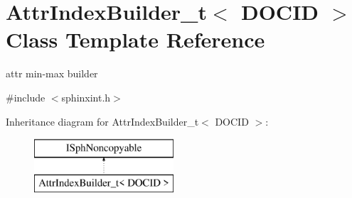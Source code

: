 \hypertarget{classAttrIndexBuilder__t}{\section{Attr\-Index\-Builder\-\_\-t$<$ D\-O\-C\-I\-D $>$ Class Template Reference}
\label{classAttrIndexBuilder__t}
}


attr min-\/max builder  




{\ttfamily \#include $<$sphinxint.\-h$>$}

Inheritance diagram for Attr\-Index\-Builder\-\_\-t$<$ D\-O\-C\-I\-D $>$\-:\begin{figure}[H]
\begin{center}
\leavevmode
\includegraphics[height=2.000000cm]{classAttrIndexBuilder__t}
\end{center}
\end{figure}
